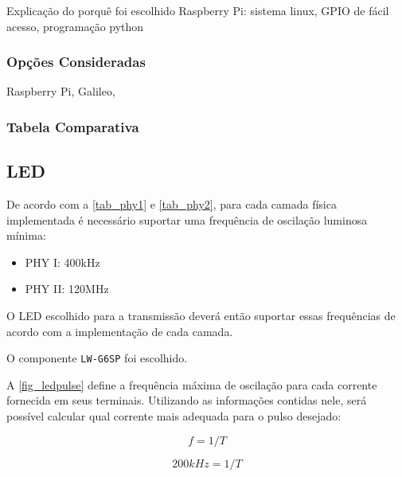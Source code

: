 	Explicação do porquê foi escolhido Raspberry Pi: sistema linux, GPIO de fácil acesso, programação python
	
	\subsubsection{Opções Consideradas}\label{uc-options}
	
	Raspberry Pi, Galileo, 
	
	\subsubsection{Tabela Comparativa}\label{uc-table}
	
	\subsection{LED}\label{hard-led}
	
	De acordo com a \autoref{tab_phy1} e \autoref{tab_phy2}, para cada camada física implementada é necessário suportar uma frequência de oscilação luminosa mínima:
	
	\begin{itemize}
		\item PHY I: 400kHz
		\item PHY II: 120MHz
	\end{itemize} 
	
	O LED escolhido para a transmissão deverá então suportar essas frequências de acordo com a implementação de cada camada. 
	
	O componente \texttt{LW-G6SP} foi escolhido.
	
	A \autoref{fig_ledpulse} define a frequência máxima de oscilação para cada corrente fornecida em seus terminais. Utilizando as informações contidas nele, será possível calcular qual corrente mais adequada para o pulso desejado:
	
	\begin{equation} \label{eq:5}
		f = 1 / T
	\end{equation}
	
	\begin{equation}
	200kHz = 1 / T
	\end{equation}
	
